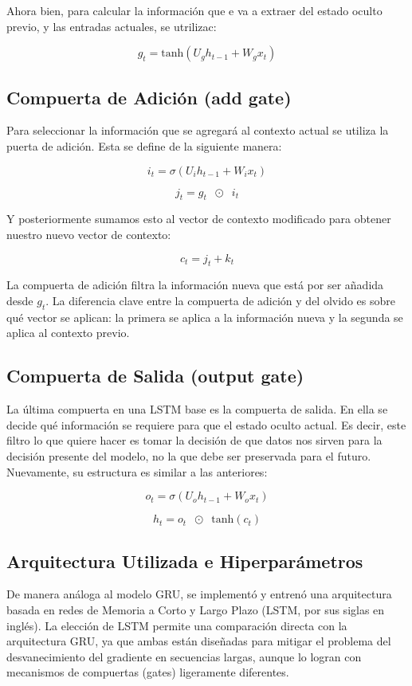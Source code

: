Ahora bien, para calcular la información que e va a extraer del estado oculto previo, y las 
entradas actuales, se utrilizac:

\[
  g_t = \text{tanh}(U_g h_{t-1} + W_gx_t)  
\]

\subsection{Compuerta de Adición (add gate)}

Para seleccionar la información que se agregará al contexto actual se utiliza la puerta de adición. Esta se define de la siguiente manera:

\[
    i_t = \sigma(U_i h_{t-1} + W_i x_t)
\]

\[
    j_t = g_t \;\; \odot \;\; i_t
\]

Y posteriormente sumamos esto al vector de contexto modificado para obtener nuestro nuevo vector de contexto:

\[
    c_t = j_t + k_t
\]

La compuerta de adición filtra la información nueva que está por ser añadida desde $g_t$. La diferencia clave entre la compuerta de adición y del olvido es sobre qué vector se aplican: la primera se aplica a la información nueva y la segunda se aplica al contexto previo. 

\subsection{Compuerta de Salida (output gate)}

La última compuerta en una LSTM base es la compuerta de salida. En ella se decide qué información se requiere para que el estado oculto actual. Es decir, este filtro lo que quiere hacer es tomar la decisión de que datos nos sirven para la decisión presente del modelo, no la que debe ser preservada para el futuro. Nuevamente, su estructura es similar a las anteriores:

\[
    o_t = \sigma(U_o h_{t-1} + W_o x_t)
\]

\[
    h_t = o_t \;\; \odot \;\; \text{tanh}(c_t)
\]


\subsection{Arquitectura Utilizada e Hiperparámetros}

De manera análoga al modelo GRU, se implementó y entrenó una arquitectura basada en redes de Memoria a Corto y Largo Plazo (LSTM, por sus siglas en inglés). La elección de LSTM permite una comparación directa con la arquitectura GRU, ya que ambas están diseñadas para mitigar el problema del desvanecimiento del gradiente en secuencias largas, aunque lo logran con mecanismos de compuertas (gates) ligeramente diferentes.

